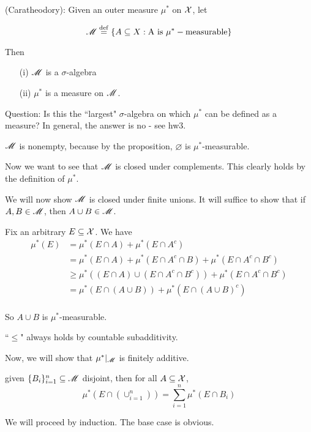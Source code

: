 \documentclass[x11names,reqno,14pt]{extarticle}
\begin{document}
\thm 

(Caratheodory): Given an outer measure $\mu^*$ on $\mathcal{X}$, let

\[
\mathscr{M} \overset{\mathrm{def}}{=} \{A\subseteq X : \text{A is }\mu^*-\text{measurable}\}
\]

Then 
\begin{itemize}
\item[(i)] $\mathscr{M}$ is a $\sigma$-algebra
\item[(ii)] $\mu^*$ is a measure on $\mathscr{M}$. 
\end{itemize}

Question: Is this the ``largest" $\sigma$-algebra on which $\mu^*$ can be defined as a measure? In general, the answer is no - see hw3. 

\proof 

$\mathscr{M}$ is nonempty, because by the proposition, $\varnothing$ is $\mu^*$-measurable.

Now we want to see that $\mathscr{M}$ is closed under complements. This clearly holds by the definition of $\mu^*$. 

We will now show $\mathscr{M}$ is closed under finite unions. It will suffice to show that if $A, B \in \mathscr{M}$, then $A \cup B \in \mathscr{M}$. 

Fix an arbitrary $E\subseteq \mathcal{X}$. We have 
\begin{align*}
\mu^*(E) & = \mu^*(E \cap A) + \mu^*(E\cap A^c) \\
			& = \mu^*(E\cap A) + \mu^*(E \cap A^c \cap B) + \mu^*(E\cap A^c\cap B^c) \\
			& \geq \mu^*((E\cap A) \cup (E \cap A^c \cap B^c)) + \mu^*(E\cap A^c\cap B^c) \\
			& = \mu^*(E\cap(A\cup B)) + \mu^*(E\cap (A \cup B)^c) \\
\end{align*}

So $A \cup B$ is $\mu^*$-measurable. 

\rem 

``$\leq$" always holds by countable subadditivity. 

Now, we will show that $\mu^*|_{\mathscr{M}}$ is finitely additive.

\claim

 given $\{B_i\}_{i=1}^n\subseteq \mathscr{M}$ disjoint, then for all $A \subseteq \mathcal{X}$, 
\[
\mu^*(E \cap (\cup_{i=1}^n)) = \sum_{i=1}^n\mu^*(E\cap B_i)
\]

\proof

We will proceed by induction. The base case is obvious. 
\end{document}
